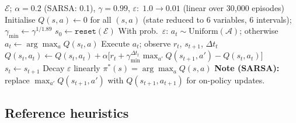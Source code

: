 \documentclass[11pt,a4paper]{article}
\begin{document}
\begin{algorithm}[H]
\caption{Q-Learning for mine truck dispatching (tabular reference)}
\label{alg:qlearning}
\begin{algorithmic}[1]
\Require $\mathcal{E}$; $\alpha{=}0.2$ (SARSA: 0.1), $\gamma{=}0.99$, $\varepsilon{:}\;1.0\!\to\!0.01$ (linear over 30{,}000 episodes)
\State Initialise $Q(s,a)\leftarrow 0$ for all $(s,a)$ (state reduced to 6 variables, 6 intervals); $\gamma_{\min}\leftarrow\gamma^{1/1.89}$
  \State $s_0\leftarrow\texttt{reset}(\mathcal{E})$
    \State With prob.\ $\varepsilon$: $a_t\sim\text{Uniform}(\mathcal{A})$; otherwise $a_t\leftarrow\arg\max_a Q(s_t,a)$
    \State Execute $a_t$; observe $r_t$, $s_{t+1}$, $\Delta t_t$
    \State $Q(s_t,a_t)\leftarrow Q(s_t,a_t)+\alpha\bigl[r_t+\gamma_{\min}^{\Delta t_t}\max_{a'}Q(s_{t+1},a')-Q(s_t,a_t)\bigr]$
    \State $s_t\leftarrow s_{t+1}$
  \EndWhile
  \State Decay $\varepsilon$ linearly
\EndFor
\Ensure $\pi^*(s)=\arg\max_a Q(s,a)$
\Statex \textbf{Note (SARSA):} replace $\max_{a'}Q(s_{t+1},a')$ with $Q(s_{t+1},a_{t+1})$ for on-policy updates.
\end{algorithmic}
\end{algorithm}

\subsection{Reference heuristics}
\label{sec:baselines-def}
\end{document}
